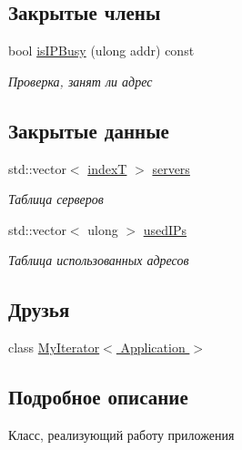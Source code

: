 \subsection*{Закрытые члены}
\begin{DoxyCompactItemize}
\item 
bool \hyperlink{class_network_service_1_1_application_a3bc3a188eb55fad7bdd9be11af54391b}{is\+I\+P\+Busy} (ulong addr) const 
\begin{DoxyCompactList}\small\item\em Проверка, занят ли адрес \end{DoxyCompactList}\end{DoxyCompactItemize}
\subsection*{Закрытые данные}
\begin{DoxyCompactItemize}
\item 
std\+::vector$<$ \hyperlink{class_network_service_1_1_application_a4cbe718a4ebf378cf75cc55fe015177a}{index\+T} $>$ \hyperlink{class_network_service_1_1_application_af499fff927e0ee95480eeac2f4bb464b}{servers}
\begin{DoxyCompactList}\small\item\em Таблица серверов \end{DoxyCompactList}\item 
std\+::vector$<$ ulong $>$ \hyperlink{class_network_service_1_1_application_a9709635bcf03ef131a655ca1c58efa6b}{used\+I\+Ps}
\begin{DoxyCompactList}\small\item\em Таблица использованных адресов \end{DoxyCompactList}\end{DoxyCompactItemize}
\subsection*{Друзья}
\begin{DoxyCompactItemize}
\item 
class \hyperlink{class_network_service_1_1_application_ad14d365afc30a96b618aab998f4572e5}{My\+Iterator$<$ Application $>$}
\end{DoxyCompactItemize}


\subsection{Подробное описание}
Класс, реализующий работу приложения 

